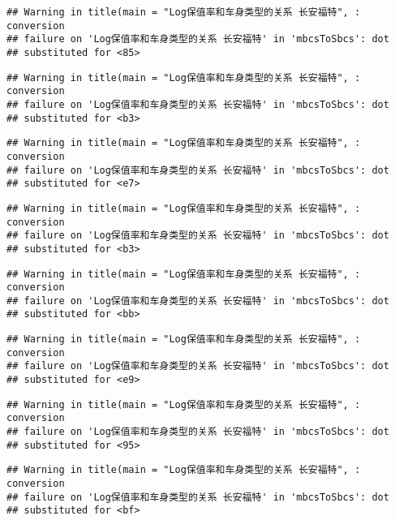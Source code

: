 \documentclass[]{article}
\begin{document}
\begin{verbatim}
## Warning in title(main = "Log保值率和车身类型的关系 长安福特", : conversion
## failure on 'Log保值率和车身类型的关系 长安福特' in 'mbcsToSbcs': dot
## substituted for <85>
\end{verbatim}

\begin{verbatim}
## Warning in title(main = "Log保值率和车身类型的关系 长安福特", : conversion
## failure on 'Log保值率和车身类型的关系 长安福特' in 'mbcsToSbcs': dot
## substituted for <b3>
\end{verbatim}

\begin{verbatim}
## Warning in title(main = "Log保值率和车身类型的关系 长安福特", : conversion
## failure on 'Log保值率和车身类型的关系 长安福特' in 'mbcsToSbcs': dot
## substituted for <e7>
\end{verbatim}

\begin{verbatim}
## Warning in title(main = "Log保值率和车身类型的关系 长安福特", : conversion
## failure on 'Log保值率和车身类型的关系 长安福特' in 'mbcsToSbcs': dot
## substituted for <b3>
\end{verbatim}

\begin{verbatim}
## Warning in title(main = "Log保值率和车身类型的关系 长安福特", : conversion
## failure on 'Log保值率和车身类型的关系 长安福特' in 'mbcsToSbcs': dot
## substituted for <bb>
\end{verbatim}

\begin{verbatim}
## Warning in title(main = "Log保值率和车身类型的关系 长安福特", : conversion
## failure on 'Log保值率和车身类型的关系 长安福特' in 'mbcsToSbcs': dot
## substituted for <e9>
\end{verbatim}

\begin{verbatim}
## Warning in title(main = "Log保值率和车身类型的关系 长安福特", : conversion
## failure on 'Log保值率和车身类型的关系 长安福特' in 'mbcsToSbcs': dot
## substituted for <95>
\end{verbatim}

\begin{verbatim}
## Warning in title(main = "Log保值率和车身类型的关系 长安福特", : conversion
## failure on 'Log保值率和车身类型的关系 长安福特' in 'mbcsToSbcs': dot
## substituted for <bf>
\end{verbatim}
\end{document}
